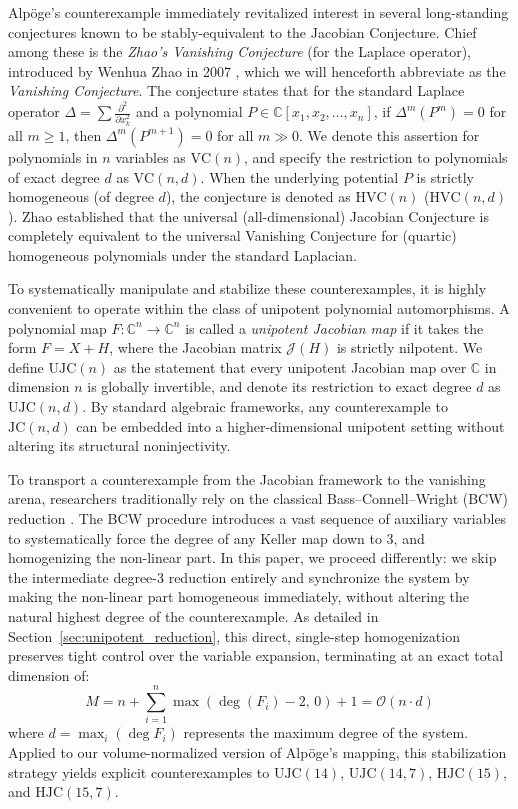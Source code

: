 \documentclass[11pt,a4paper]{article}
\begin{document}
Alpöge's counterexample immediately revitalized interest in several long-standing conjectures known to be stably-equivalent to the Jacobian Conjecture. Chief among these is the \emph{Zhao's Vanishing Conjecture} (for the Laplace operator), introduced by Wenhua Zhao in 2007 \cite{zhao2007}, which we will henceforth abbreviate as the \emph{Vanishing Conjecture}. The conjecture states that for the standard Laplace operator $\Delta = \sum \frac{\partial^2}{\partial x_k^2}$ and a polynomial $P \in \mathbb{C}[x_1,x_2,\ldots,x_n]$, if $\Delta^m(P^m) = 0$ for all $m \ge 1$, then $\Delta^m(P^{m+1}) = 0$ for all $m \gg 0$. We denote this assertion for polynomials in $n$ variables as $\mathrm{VC}(n)$, and specify the restriction to polynomials of exact degree $d$ as $\mathrm{VC}(n,d)$. When the underlying potential $P$ is strictly homogeneous (of degree $d$), the conjecture is denoted as $\mathrm{HVC}(n)$ ($\mathrm{HVC}(n,d)$). Zhao established that the universal (all-dimensional) Jacobian Conjecture is completely equivalent to the universal Vanishing Conjecture for (quartic) homogeneous polynomials under the standard Laplacian.

To systematically manipulate and stabilize these counterexamples, it is highly convenient to operate within the class of unipotent polynomial automorphisms. A polynomial map $F: \mathbb{C}^n \to \mathbb{C}^n$ is called a \emph{unipotent Jacobian map} if it takes the form $F = X + H$, where the Jacobian matrix $\mathcal{J}(H)$ is strictly nilpotent. We define $\mathrm{UJC}(n)$ as the statement that every unipotent Jacobian map over $\mathbb{C}$ in dimension $n$ is globally invertible, and denote its restriction to exact degree $d$ as $\mathrm{UJC}(n,d)$. By standard algebraic frameworks, any counterexample to $\mathrm{JC}(n,d)$ can be embedded into a higher-dimensional unipotent setting without altering its structural noninjectivity.

To transport a counterexample from the Jacobian framework to the vanishing arena, researchers traditionally rely on the classical Bass--Connell--Wright (BCW) reduction \cite{BCW1982}. The BCW procedure introduces a vast sequence of auxiliary variables to systematically force the degree of any Keller map down to 3, and homogenizing the non-linear part. In this paper, we proceed differently: we skip the intermediate degree-3 reduction entirely and synchronize the system by making the non-linear part homogeneous immediately, without altering the natural highest degree of the counterexample. As detailed in Section~\ref{sec:unipotent_reduction}, this direct, single-step homogenization preserves tight control over the variable expansion, terminating at an exact total dimension of:
\begin{equation} \label{eq:hmgM}
M = n + \sum_{i=1}^{n} \max(\deg(F_i) - 2, \, 0) + 1 = \mathcal{O}(n \cdot d)
\end{equation}
where $d = \max_{i} (\deg F_i)$ represents the maximum degree of the system. Applied to our volume-normalized version of Alpöge's mapping, this stabilization strategy yields explicit counterexamples to $\mathrm{UJC}(14)$, $\mathrm{UJC}(14,7)$, $\mathrm{HJC}(15)$, and $\mathrm{HJC}(15,7)$.
\end{document}
